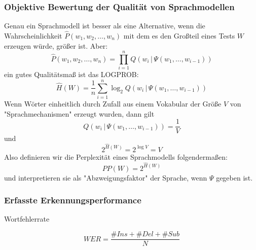 \subsubsection*{Objektive Bewertung der Qualität von Sprachmodellen}

Genau ein Sprachmodell ist besser als eine Alternative, wenn die Wahrscheinlichkeit $\hat{P}(w_1,w_2,\dots ,w_n)$ mit dem es den Großteil eines Tests $W$ erzeugen würde, größer ist. Aber:
$$\hat{P}(w_1,w_2,\dots ,w_n) = \prod\limits_{i=1}^n Q(w_i \, | \, \Psi(w_1,\dots,w_{i-1}))$$
ein gutes Qualitätsmaß ist das LOGPROB:
$$\hat{H}(W) = \frac{1}{n} \sum\limits_{i=1}^n \log_2 Q(w_i \, | \, \Psi(w_1,\dots,w_{i-1}))$$
Wenn Wörter einheitlich durch Zufall aus einem Vokabular der Größe $V$ von "{}Sprachmechanismen"{} erzeugt wurden, dann gilt
$$Q(w_i \, | \, \Psi(w_1,\dots,w_{i-1})) = \frac{1}{V}$$ und $$2^{\hat{H}(W)} = 2^{\log V} = V$$
Also definieren wir die Perplexität eines Sprachmodells folgendermaßen: $$PP(W) = 2^{\hat{H}(W)}$$
und interpretieren sie als "{}Abzweigungsfaktor"{} der Sprache, wenn $\Psi$ gegeben ist.

\subsubsection*{Erfasste Erkennungsperformance}

Wortfehlerrate

$$WER = \frac{\# Ins + \# Del + \# Sub}{N}$$



